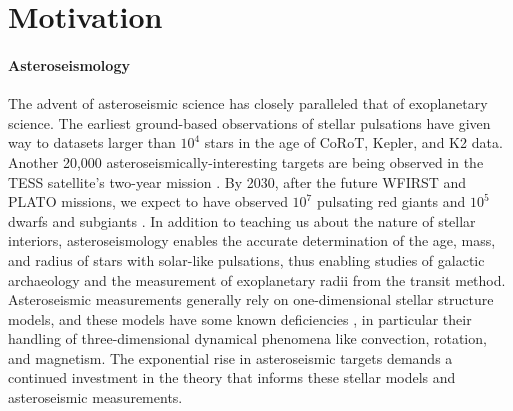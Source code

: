 \documentclass[11pt, preprint]{aastex}
\begin{document}
\section{Motivation}
\vspace{-6pt}

\paragraph{Asteroseismology}
\label{sct:asteroseismology}
The advent of asteroseismic science has closely paralleled that of exoplanetary science.
The earliest ground-based observations of stellar pulsations\citep[e.g.,][]{kjeldsen&frandsen1991, bouchy&carrier2001, bedding&all2001} have given way to datasets larger than $10^4$ stars \citep[e.g.,][]{yu&all2018, santos&all2019b} in the age of CoRoT, Kepler, and K2 data.
Another 20,000 asteroseismically-interesting targets are being observed in the TESS satellite's two-year mission \citep{schofield&all2019}.
By 2030, after the future WFIRST and PLATO missions, we expect to have observed $10^7$ pulsating red giants and $10^5$ dwarfs and subgiants \citep{huber&all2019}.
In addition to teaching us about the nature of stellar interiors, asteroseismology enables the accurate determination of the age, mass, and radius of stars with solar-like pulsations, thus enabling studies of galactic archaeology and the measurement of exoplanetary radii from the transit method.
Asteroseismic measurements generally rely on one-dimensional stellar structure models, and these models have some known deficiencies \citep{buldgen2019}, in particular their handling of three-dimensional dynamical phenomena like convection, rotation, and magnetism.
The exponential rise in asteroseismic targets demands a continued investment in the theory that informs these stellar models and asteroseismic measurements.
\end{document}
